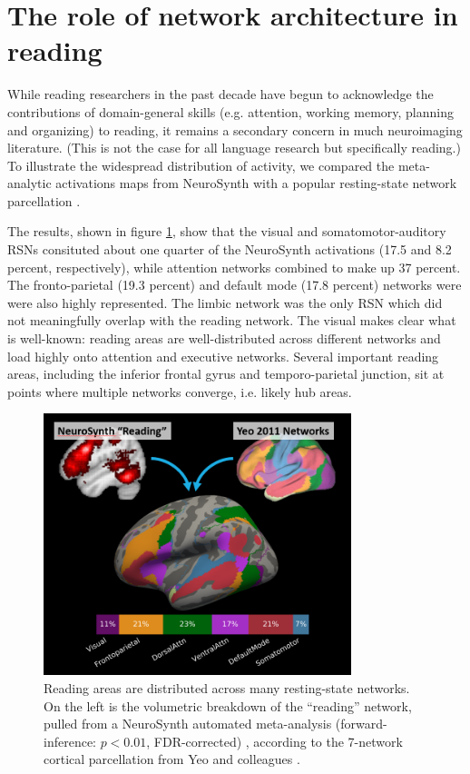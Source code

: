\section{The role of network architecture in reading}
While reading researchers in the past decade have begun to acknowledge the contributions of domain-general skills (e.g. attention, working memory, planning and organizing) to reading, it remains a secondary concern in much neuroimaging literature. (This is not the case for all language research but specifically reading.) To illustrate the widespread distribution of activity, we compared the meta-analytic activations maps from NeuroSynth with a popular resting-state network parcellation \citep{Bailey2018}. 

The results, shown in figure \ref{fig:ch1-yeo-to-neurosynth}, show that the visual and somatomotor-auditory RSNs consituted about one quarter of the NeuroSynth activations (17.5 and 8.2 percent, respectively), while attention networks combined to make up 37 percent. The fronto-parietal (19.3 percent) and default mode (17.8 percent) networks were were also highly represented. The limbic network was the only RSN which did not meaningfully overlap with the reading network. The visual makes clear what is well-known: reading areas are well-distributed across different networks and load highly onto attention and executive networks. Several important reading areas, including the inferior frontal gyrus and temporo-parietal junction, sit at points where multiple networks converge, i.e. likely hub areas.

\begin{figure}[t]
\centering
\includegraphics[height=3in]{images/ch1-yeo-to-neurosynth.png}
    \caption[Reading areas are distributed across many resting-state networks.]{Reading areas are distributed across many resting-state networks. On the left is the volumetric breakdown of the ``reading'' network, pulled from a NeuroSynth automated meta-analysis (forward-inference: $p < 0.01$, FDR-corrected) \citep{Yarkoni2011}, according to the 7-network cortical parcellation from Yeo and colleagues \citep{Yeo2011}.}
    \label{fig:ch1-yeo-to-neurosynth}
\end{figure}

